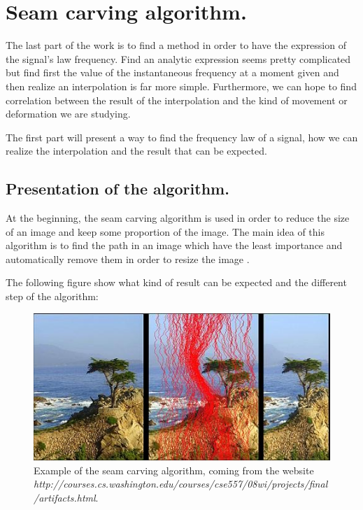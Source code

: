 


\chapter{Seam carving algorithm.}

\medskip

The last part of the work is to find a method in order to have the expression of the signal's law frequency. Find an analytic expression seems pretty complicated but find first the value of the instantaneous frequency at a moment given and then realize an interpolation is far more simple. Furthermore, we can hope to find correlation between the result of the interpolation and the kind of movement or deformation we are studying.

The first part will present a way to find the frequency law of a signal, how we can realize the interpolation and the result that can be expected.

\medskip

\section{Presentation of the algorithm.}


At the beginning, the seam carving algorithm is used in order to reduce the size of an image and keep some proportion of the image. The main idea of this algorithm is to find the path in an image which have the least importance and automatically remove them in order to resize the image \cite{avidan2007seam}.

The following figure show what kind of result can be expected and the different step of the algorithm:

\begin{figure}[H]
\centering
    \includegraphics[scale=1,angle=0]{Images/ankit-rahul.jpg}
    \caption{Example of the seam carving algorithm, coming from the website \textit{http://courses.cs.washington.edu/courses/cse557/08wi/projects/final/artifacts.html}.}
    \label{fig:ankit-rahul}
\end{figure}


